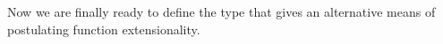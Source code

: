 \ccpad
Now we are finally ready to define the type  that gives an alternative means of postulating function
extensionality.
\ccpad
\begin{code}%
\>[1]\AgdaSpace{}%
\AgdaSymbol{:}\AgdaSpace{}%
\AgdaSymbol{(}\AgdaSpace{}%
\AgdaSpace{}%
\AgdaSymbol{:}\AgdaSpace{}%
\AgdaSymbol{)}\AgdaSpace{}%
\AgdaSpace{}%
\AgdaSymbol{(}\AgdaSpace{}%
\AgdaSpace{}%
\AgdaSymbol{)}\AgdaSpace{}%
\<%
\\
%
\>[1]\AgdaSpace{}%
\AgdaSpace{}%
\AgdaSpace{}%
\AgdaSymbol{=}\AgdaSpace{}%
\AgdaSymbol{\{}\AgdaSpace{}%
\AgdaSymbol{:}\AgdaSpace{}%
\AgdaSpace{}%
\AgdaSymbol{\}\{}\AgdaSpace{}%
\AgdaSymbol{:}\AgdaSpace{}%
\AgdaSpace{}%
\AgdaSpace{}%
\AgdaSpace{}%
\AgdaSymbol{\}}\AgdaSpace{}%
\AgdaSymbol{(}\AgdaSpace{}%
\AgdaSpace{}%
\AgdaSymbol{:}\AgdaSpace{}%
\AgdaSpace{}%
\AgdaSymbol{)}\AgdaSpace{}%
\AgdaSpace{}%
\AgdaSpace{}%
\AgdaSymbol{(}\AgdaSpace{}%
\AgdaSpace{}%
\AgdaSymbol{)}\<%
\end{code}

